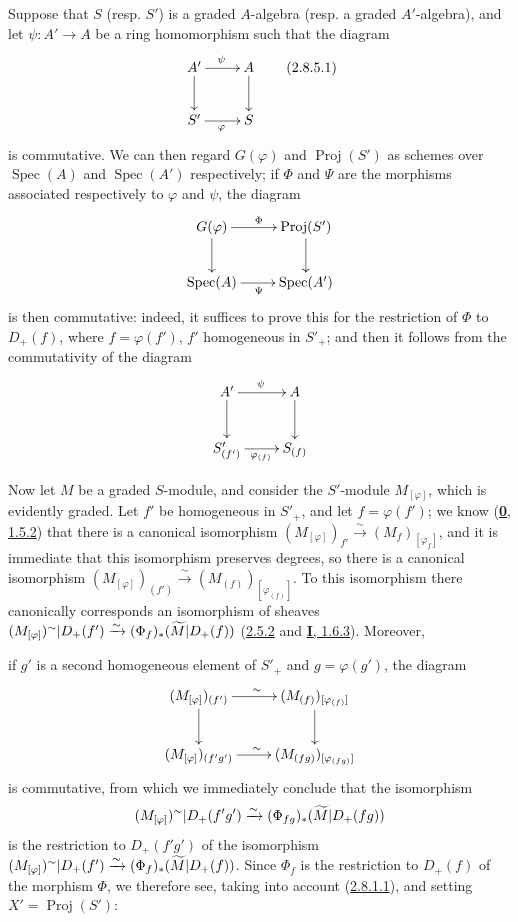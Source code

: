 \begin{env}[2.8.5]
\label{II.2.8.5}
Suppose that $S$ (resp. $S'$) is a graded $A$-algebra (resp. a graded
$A'$-algebra), and let $\psi:A'\to A$ be a ring homomorphism such that the
diagram
\[
\label{II.2.8.5.1}
  \xymatrix{
    A'\ar[r]^{\psi}\ar[d] & A\ar[d]\\
    S'\ar[r]_{\varphi} & S
  }
\tag{2.8.5.1}
\]
is commutative. We can then regard $G(\varphi)$ and
$\operatorname{Proj}(S')$ as schemes over $\operatorname{Spec}(A)$ and
$\operatorname{Spec}(A')$ respectively; if $\Phi$ and $\Psi$ are the morphisms
associated respectively to $\varphi$ and $\psi$, the diagram
\[
  \xymatrix{
    G(\varphi)\ar[r]^{\Phi}\ar[d] & \operatorname{Proj}(S')\ar[d]\\
    \operatorname{Spec}(A)\ar[r]_{\Psi} & \operatorname{Spec}(A')
  }
\]
is then commutative: indeed, it suffices to prove this for the restriction of
$\Phi$ to $D_+(f)$, where $f=\varphi(f')$, $f'$ homogeneous in $S'_+$; and
then it follows from the commutativity of the diagram
\[
  \xymatrix{
    A'\ar[r]^{\psi}\ar[d] & A\ar[d]\\
    S'_{(f')}\ar[r]_{\varphi_{(f)}} & S_{(f)}
  }
\]
\end{env}

\begin{env}[2.8.6]
\label{II.2.8.6}
Now let $M$ be a graded $S$-module, and consider the $S'$-module
$M_{[\varphi]}$, which is evidently graded. Let $f'$ be homogeneous in
$S'_+$, and let $f=\varphi(f')$; we know
(\hyperref[0.1.5.2]{\textbf{0}, 1.5.2}) that there is a canonical isomorphism
$(M_{[\varphi]})_{f'}\xrightarrow{\sim}(M_f)_{[\varphi_f]}$, and it is
immediate that this isomorphism preserves degrees, so there is a canonical
isomorphism
$(M_{[\varphi]})_{(f')}\xrightarrow{\sim}
(M_{(f)})_{[\varphi_{(f)}]}$. To this isomorphism there canonically
corresponds an isomorphism of sheaves
$(M_{[\varphi]})^{\sim}|D_+(f')
\xrightarrow{\sim}(\Phi_f)_*(\widetilde{M}|D_+(f))$
(\hyperref[II.2.5.2]{2.5.2} and
\hyperref[I.1.6.3]{\textbf{I}, 1.6.3}). Moreover,

if $g'$ is a second homogeneous element of $S'_+$ and $g=\varphi(g')$, the
diagram
\[
  \xymatrix{
    (M_{[\varphi]})_{(f')}\ar[r]^{\sim}\ar[d]
    & (M_{(f)})_{[\varphi_{(f)}]}\ar[d]\\
    (M_{[\varphi]})_{(f'g')}\ar[r]^{\sim}
    & (M_{(fg)})_{[\varphi_{(fg)}]}
  }
\]
is commutative, from which we immediately conclude that the isomorphism
\[
  (M_{[\varphi]})^{\sim}|D_+(f'g')
  \xrightarrow{\sim}(\Phi_{fg})_*(\widetilde{M}|D_+(fg))
\]
is the restriction to $D_+(f'g')$ of the isomorphism
$(M_{[\varphi]})^{\sim}|D_+(f')
\xrightarrow{\sim}(\Phi_f)_*(\widetilde{M}|D_+(f))$. Since $\Phi_f$ is the
restriction to $D_+(f)$ of the morphism $\Phi$, we therefore see, taking into
account (\hyperref[II.2.8.1.1]{2.8.1.1}), and setting
$X'=\operatorname{Proj}(S')$:
\end{env}

